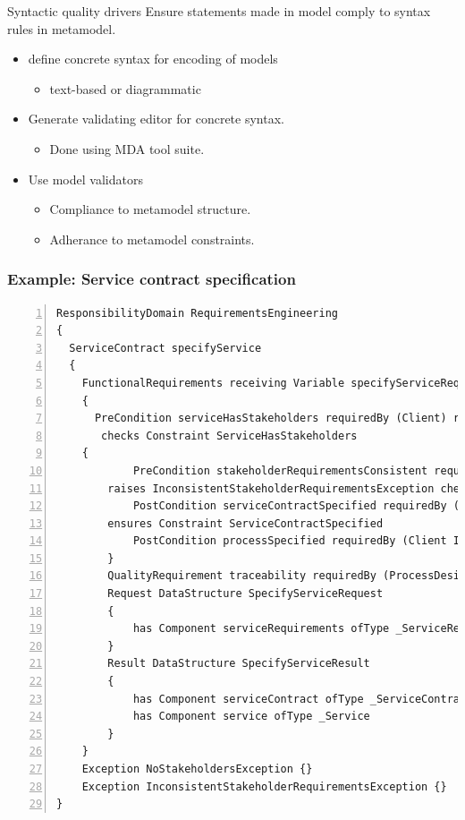 \documentclass[xcolor=svgnames]{beamer}
\begin{document}

\begin{frame}{Syntactic quality drivers}
  Ensure statements made in model comply to syntax rules in metamodel.
  \pause
  \begin{itemize} 
    \item<+-| alert@+> define concrete syntax for encoding of models 
      \begin{itemize}
	\item text-based or diagrammatic
      \end{itemize}
    \item<+-| alert@+> Generate validating editor for concrete syntax.
      \begin{itemize}
	\item Done using MDA tool suite.
      \end{itemize}
    \item<+-| alert@+> Use model validators
      \begin{itemize}
	\item Compliance to metamodel structure.
	\item Adherance to metamodel constraints.
      \end{itemize}
  \end{itemize}
\end{frame}


\begin{frame}[fragile]
\frametitle{Example: Service contract specification}

\lstset{language=urdad,label=serviceTextSyntax}
\begin{lstlisting}[numbers=left,escapechar=|]
ResponsibilityDomain RequirementsEngineering
{
  ServiceContract specifyService
  {
    FunctionalRequirements receiving Variable specifyServiceRequest ofType SpecifyServiceRequest
    {
      PreCondition serviceHasStakeholders requiredBy (Client) raises NoStakeholdersException 
       checks Constraint ServiceHasStakeholders
	{
            PreCondition stakeholderRequirementsConsistent requiredBy (Client Implementation Testing) 
		raises InconsistentStakeholderRequirementsException checks Constraint RequirementsConsistent
            PostCondition serviceContractSpecified requiredBy (Client Implementation Testing) 
		ensures Constraint ServiceContractSpecified
            PostCondition processSpecified requiredBy (Client Implementation) ensures Constraint ProcessSpecified
        }
        QualityRequirement traceability requiredBy (ProcessDesign ProjectManagement Development)
        Request DataStructure SpecifyServiceRequest
        {
            has Component serviceRequirements ofType _ServiceRequirements
        }
        Result DataStructure SpecifyServiceResult
        {
            has Component serviceContract ofType _ServiceContract
            has Component service ofType _Service
        }
    }
    Exception NoStakeholdersException {}
    Exception InconsistentStakeholderRequirementsException {}
}
\end{lstlisting}
\end{frame}
\end{document}
